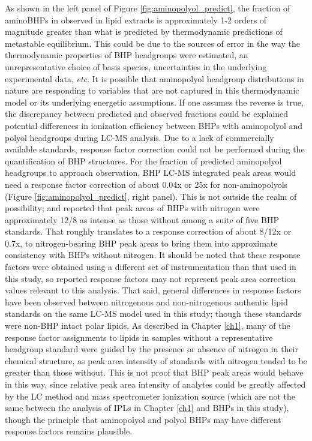 As shown in the left panel of Figure \ref{fig:aminopolyol_predict}, the fraction of aminoBHPs in observed in lipid extracts is approximately 1-2 orders of magnitude greater than what is predicted by thermodynamic predictions of metastable equilibrium. This could be due to the sources of error in the way the thermodynamic properties of BHP headgroups were estimated, an unrepresentative choice of basis species, uncertainties in the underlying experimental data, \textit{etc}. It is possible that aminopolyol headgroup distributions in nature are responding to variables that are not captured in this thermodynamic model or its underlying energetic assumptions. If one assumes the reverse is true, the discrepancy between predicted and observed fractions could be explained potential differences in ionization efficiency between BHPs with aminopolyol and polyol headgroups during LC-MS analysis. Due to a lack of commercially available standards, response factor correction could not be performed during the quantification of BHP structures. For the fraction of predicted aminopolyol headgroups to approach observation, BHP LC-MS integrated peak areas would need a response factor correction of about 0.04x or 25x for non-aminopolyols (Figure \ref{fig:aminopolyol_predict}, right panel). This is not outside the realm of possibility; \cite{cooke2008bacterial} and \cite{van2012bacteriohopanepolyol} reported that peak areas of BHPs with nitrogen were approximately 12/8 as intense as those without among a suite of five BHP standards. That roughly translates to a response correction of about 8/12x or 0.7x, to nitrogen-bearing BHP peak areas to bring them into approximate consistency with BHPs without nitrogen. It should be noted that these response factors were obtained using a different set of instrumentation than that used in this study, so reported response factors may not represent peak area correction values relevant to this analysis. That said, general differences in response factors have been observed between nitrogenous and non-nitrogenous authentic lipid standards on the same LC-MS model used in this study; though these standards were non-BHP intact polar lipids. As described in Chapter \ref{ch1}, many of the response factor assignments to lipids in samples without a representative headgroup standard were guided by the presence or absence of nitrogen in their chemical structure, as peak area intensity of standards with nitrogen tended to be greater than those without. This is not proof that BHP peak areas would behave in this way, since relative peak area intensity of analytes could be greatly affected by the LC method and mass spectrometer ionization source (which are not the same between the analysis of IPLs in Chapter \ref{ch1} and BHPs in this study), though the principle that aminopolyol and polyol BHPs may have different response factors remains plausible.

